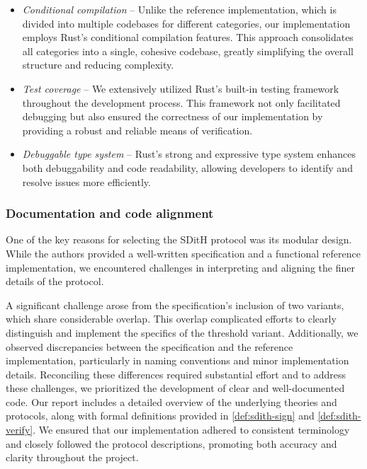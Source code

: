 \documentclass[11pt]{report}
\theoremstyle{definition}
\theoremstyle{plain}
\begin{document}
\begin{itemize}
  \item \textit{Conditional compilation} -- Unlike the reference implementation, which is divided into multiple codebases for different categories, our implementation employs Rust's conditional compilation features. This approach consolidates all categories into a single, cohesive codebase, greatly simplifying the overall structure and reducing complexity.
  \item \textit{Test coverage} -- We extensively utilized Rust's built-in testing framework throughout the development process. This framework not only facilitated debugging but also ensured the correctness of our implementation by providing a robust and reliable means of verification.
  \item \textit{Debuggable type system} -- Rust's strong and expressive type system enhances both debuggability and code readability, allowing developers to identify and resolve issues more efficiently.
\end{itemize}

\subsubsection{Documentation and code alignment}

One of the key reasons for selecting the SDitH protocol was its modular design. While the authors provided a well-written specification and a functional reference implementation, we encountered challenges in interpreting and aligning the finer details of the protocol.

A significant challenge arose from the specification's inclusion of two variants, which share considerable overlap. This overlap complicated efforts to clearly distinguish and implement the specifics of the threshold variant. Additionally, we observed discrepancies between the specification and the reference implementation, particularly in naming conventions and minor implementation details. Reconciling these differences required substantial effort and to address these challenges, we prioritized the development of clear and well-documented code. Our report includes a detailed overview of the underlying theories and protocols, along with formal definitions provided in \autoref{def:sdith-sign} and \autoref{def:sdith-verify}. We ensured that our implementation adhered to consistent terminology and closely followed the protocol descriptions, promoting both accuracy and clarity throughout the project.
\end{document}

